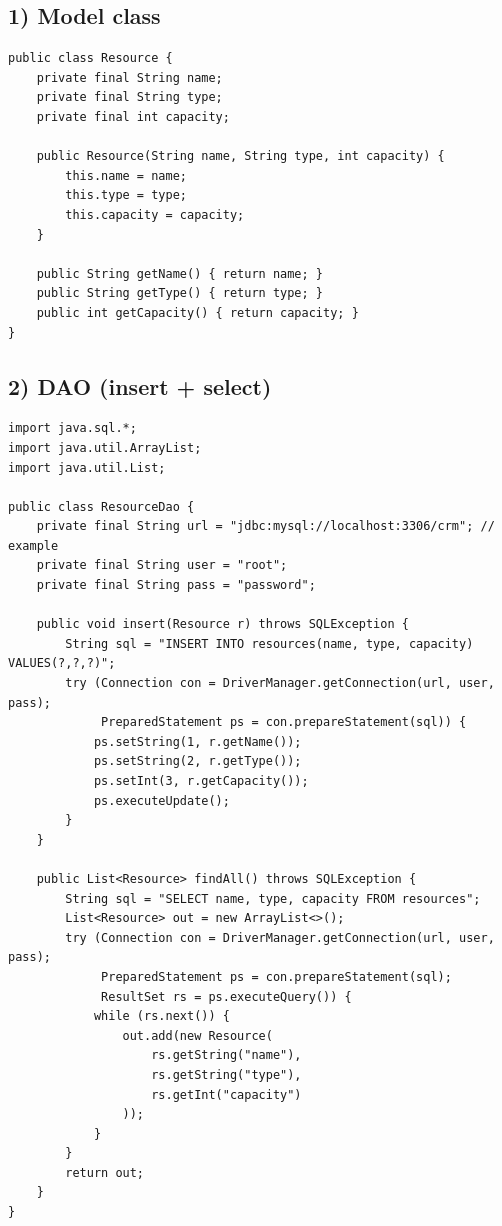 \documentclass[11pt]{article}
\begin{document}
\subsection*{1) Model class}
\begin{lstlisting}
public class Resource {
    private final String name;
    private final String type;
    private final int capacity;

    public Resource(String name, String type, int capacity) {
        this.name = name;
        this.type = type;
        this.capacity = capacity;
    }

    public String getName() { return name; }
    public String getType() { return type; }
    public int getCapacity() { return capacity; }
}
\end{lstlisting}

\subsection*{2) DAO (insert + select)}
\begin{lstlisting}
import java.sql.*;
import java.util.ArrayList;
import java.util.List;

public class ResourceDao {
    private final String url = "jdbc:mysql://localhost:3306/crm"; // example
    private final String user = "root";
    private final String pass = "password";

    public void insert(Resource r) throws SQLException {
        String sql = "INSERT INTO resources(name, type, capacity) VALUES(?,?,?)";
        try (Connection con = DriverManager.getConnection(url, user, pass);
             PreparedStatement ps = con.prepareStatement(sql)) {
            ps.setString(1, r.getName());
            ps.setString(2, r.getType());
            ps.setInt(3, r.getCapacity());
            ps.executeUpdate();
        }
    }

    public List<Resource> findAll() throws SQLException {
        String sql = "SELECT name, type, capacity FROM resources";
        List<Resource> out = new ArrayList<>();
        try (Connection con = DriverManager.getConnection(url, user, pass);
             PreparedStatement ps = con.prepareStatement(sql);
             ResultSet rs = ps.executeQuery()) {
            while (rs.next()) {
                out.add(new Resource(
                    rs.getString("name"),
                    rs.getString("type"),
                    rs.getInt("capacity")
                ));
            }
        }
        return out;
    }
}
\end{lstlisting}
\end{document}
